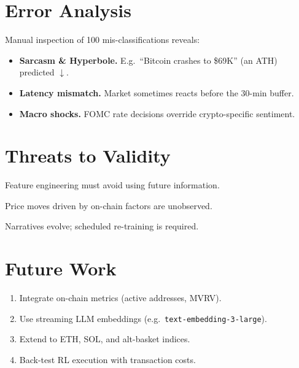 \documentclass[12pt,a4paper]{article}
\begin{document}
\section{Error Analysis}
Manual inspection of 100 mis-classifications reveals:

\begin{itemize}[nosep]
\item \textbf{Sarcasm \& Hyperbole.}
      E.g.\ “Bitcoin crashes to \$69K” (an ATH) predicted \(\downarrow\).
\item \textbf{Latency mismatch.}
      Market sometimes reacts before the 30-min buffer.
\item \textbf{Macro shocks.}
      FOMC rate decisions override crypto-specific sentiment.
\end{itemize}

\section{Threats to Validity}
\begin{description}[leftmargin=1.8cm,style=nextline]
\item[Look-ahead bias.]
      Feature engineering must avoid using future information.
\item[Label noise.]
      Price moves driven by on-chain factors are unobserved.
\item[Concept drift.]
      Narratives evolve; scheduled re-training is required.
\end{description}

\section{Future Work}
\begin{enumerate}[nosep]
\item Integrate on-chain metrics (active addresses, MVRV).
\item Use streaming LLM embeddings (e.g.\ \texttt{text-embedding-3-large}).
\item Extend to ETH, SOL, and alt-basket indices.
\item Back-test RL execution with transaction costs.
\end{enumerate}

\end{document}
